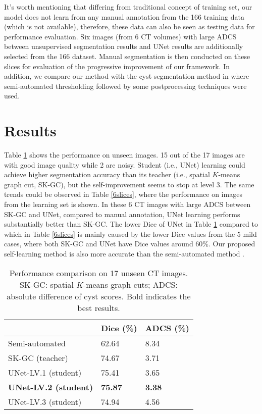 \documentclass{article}
\begin{document}
It's worth mentioning that differing from traditional concept of training set, our model does not learn from any manual annotation from the 166 training data (which is not available), therefore, these data can also be seen as testing data for performance evaluation. Six images (from 6 CT volumes) with large ADCS between unsupervised segmentation results and UNet results are additionally selected from the 166 dataset. Manual segmentation is then conducted on these slices for evaluation of the progressive improvement of our framework. In addition, we compare our method with the cyst segmentation method in \cite{yao2014sustained} where semi-automated thresholding followed by some postprocessing techniques were used.

\section{Results}
Table \ref{17slices} shows the performance on unseen images. 15 out of the 17 images are with good image quality while 2 are noisy. Student (i.e., UNet) learning could achieve higher segmentation accuracy than its teacher (i.e., spatial $K$-means graph cut, SK-GC), but the self-improvement seems to stop at level 3.  
The same trends could be observed in Table \ref{6slices}, where the performance on images from the learning set is shown. In these 6 CT images with large ADCS between SK-GC and UNet, compared to manual annotation, UNet learning performs substantially better than SK-GC. The lower Dice of UNet in Table \ref{17slices} compared to which in Table \ref{6slices} is mainly caused by the lower Dice values from the 5 mild cases, where both SK-GC and UNet have Dice values around 60\%. Our proposed self-learning method is also more accurate than the semi-automated method \cite{yao2014sustained}.

\begin{table}[!t] 
\centering
\caption{Performance comparison on 17 unseen CT images. SK-GC: spatial $K$-means graph cuts; ADCS: absolute difference of cyst scores. Bold indicates the best results.
}
\label{17slices}
\begin{tabular}{p{3cm}p{2.2cm}p{2.2cm}}
\hline
 & Dice (\%) & ADCS (\%)\\
\hline
Semi-automated \cite{yao2014sustained} & 62.64 & 8.34 \\
SK-GC (teacher) & 74.67 & 3.71 \\
UNet-LV.1 (student) & 75.41 & 3.65 \\
\textbf{UNet-LV.2 (student)} & \textbf{75.87} & \textbf{3.38} \\
UNet-LV.3 (student) & 74.94 & 4.56 \\
\hline
\end{tabular}
\end{table}
\end{document}
